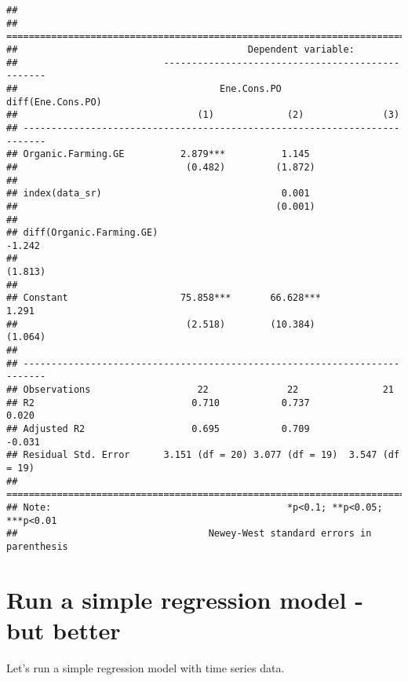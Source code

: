 \documentclass[
]{article}
\begin{document}
\begin{verbatim}
## 
## ==========================================================================
##                                         Dependent variable:               
##                          -------------------------------------------------
##                                    Ene.Cons.PO           diff(Ene.Cons.PO)
##                                (1)             (2)              (3)       
## --------------------------------------------------------------------------
## Organic.Farming.GE          2.879***          1.145                       
##                              (0.482)         (1.872)                      
##                                                                           
## index(data_sr)                                0.001                       
##                                              (0.001)                      
##                                                                           
## diff(Organic.Farming.GE)                                      -1.242      
##                                                               (1.813)     
##                                                                           
## Constant                    75.858***       66.628***          1.291      
##                              (2.518)        (10.384)          (1.064)     
##                                                                           
## --------------------------------------------------------------------------
## Observations                   22              22               21        
## R2                            0.710           0.737            0.020      
## Adjusted R2                   0.695           0.709           -0.031      
## Residual Std. Error      3.151 (df = 20) 3.077 (df = 19)  3.547 (df = 19) 
## ==========================================================================
## Note:                                          *p<0.1; **p<0.05; ***p<0.01
##                                  Newey-West standard errors in parenthesis
\end{verbatim}

\hypertarget{run-a-simple-regression-model---but-better}{%
\section{Run a simple regression model - but
better}\label{run-a-simple-regression-model---but-better}}

Let's run a simple regression model with time series data.
\end{document}
